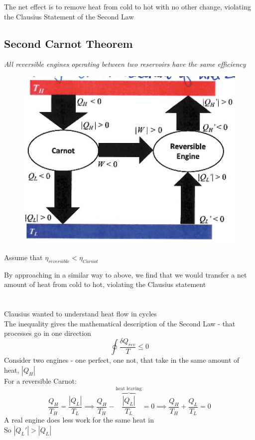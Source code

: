 \documentclass[a4paper, 11pt, normalem]{report}
\begin{document}
The net effect is to remove heat from cold to hot with no other change, violating the Clausius Statement of the Second Law

\section{Second Carnot Theorem}
\emph{All reversible engines operating between two reservoirs have the same efficiency}

\begin{figure}
    \begin{center}
        \vspace{-20pt}
        \includegraphics[scale=0.4]{Clausius2.png}
    \end{center}
\end{figure}

Assume that $\eta_{reversible} < \eta_{Carnot}$

By approaching in a similar way to above, we find that we would transfer a net amount of heat from cold to hot, violating the Clausius statement

\chapter{}
Clausius wanted to understand heat flow in cycles \\
The inequality gives the mathematical description of the Second Law - that processes go in one direction
\begin{equation*}
    \oint \frac{\delta Q_{rev}}{T} \leq 0
\end{equation*}
Consider two engines - one perfect, one not, that take in the same amount of heat, $|Q_H|$ \\
For a reversible Carnot:
\begin{equation*}
    \frac{Q_H}{T_H} = \frac{|Q_L|}{T_L} \implies \frac{Q_{H}}{T_H} - \overbrace{\frac{|Q_L|}{T_L}}^{\text{heat leaving}} = 0 \implies \frac{Q_{H}}{T_H} + \frac{Q_{L}}{T_L} = 0
\end{equation*}
A real engine does less work for the same heat in \\
So $|Q_L'| > |Q_L|$
\end{document}
